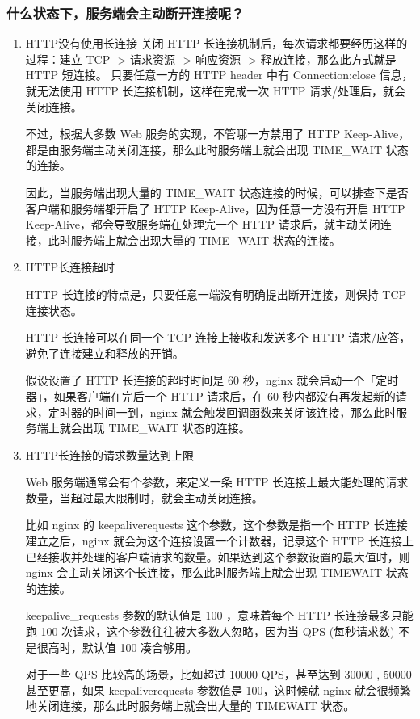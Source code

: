 \documentclass[11pt]{article}
\begin{document}
\subsubsection{什么状态下，服务端会主动断开连接呢？}
\label{sec:org19038e1}
\begin{enumerate}
\item HTTP没有使用长连接
关闭 HTTP 长连接机制后，每次请求都要经历这样的过程：建立 TCP -> 请求资源 -> 响应资源 -> 释放连接，那么此方式就是 HTTP 短连接。
只要任意一方的 HTTP header 中有 Connection:close 信息，就无法使用 HTTP 长连接机制，这样在完成一次 HTTP 请求/处理后，就会关闭连接。

不过，根据大多数 Web 服务的实现，不管哪一方禁用了 HTTP Keep-Alive，都是由服务端主动关闭连接，那么此时服务端上就会出现 TIME\_WAIT 状态的连接。

因此，当服务端出现大量的 TIME\_WAIT 状态连接的时候，可以排查下是否客户端和服务端都开启了 HTTP Keep-Alive，因为任意一方没有开启 HTTP Keep-Alive，都会导致服务端在处理完一个 HTTP 请求后，就主动关闭连接，此时服务端上就会出现大量的 TIME\_WAIT 状态的连接。

\item HTTP长连接超时

HTTP 长连接的特点是，只要任意一端没有明确提出断开连接，则保持 TCP 连接状态。

HTTP 长连接可以在同一个 TCP 连接上接收和发送多个 HTTP 请求/应答，避免了连接建立和释放的开销。

假设设置了 HTTP 长连接的超时时间是 60 秒，nginx 就会启动一个「定时器」，如果客户端在完后一个 HTTP 请求后，在 60 秒内都没有再发起新的请求，定时器的时间一到，nginx 就会触发回调函数来关闭该连接，那么此时服务端上就会出现 TIME\_WAIT 状态的连接。

\item HTTP长连接的请求数量达到上限

Web 服务端通常会有个参数，来定义一条 HTTP 长连接上最大能处理的请求数量，当超过最大限制时，就会主动关闭连接。

比如 nginx 的 keepaliverequests 这个参数，这个参数是指一个 HTTP 长连接建立之后，nginx 就会为这个连接设置一个计数器，记录这个 HTTP 长连接上已经接收并处理的客户端请求的数量。如果达到这个参数设置的最大值时，则 nginx 会主动关闭这个长连接，那么此时服务端上就会出现 TIMEWAIT 状态的连接。

keepalive\_requests 参数的默认值是 100 ，意味着每个 HTTP 长连接最多只能跑 100 次请求，这个参数往往被大多数人忽略，因为当 QPS (每秒请求数) 不是很高时，默认值 100 凑合够用。

对于一些 QPS 比较高的场景，比如超过 10000 QPS，甚至达到 30000 , 50000 甚至更高，如果 keepaliverequests 参数值是 100，这时候就 nginx 就会很频繁地关闭连接，那么此时服务端上就会出大量的 TIMEWAIT 状态。
\end{enumerate}
\end{document}
